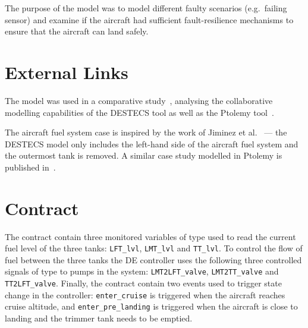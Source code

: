 The purpose of the model was to model different faulty scenarios
(e.g.\ failing sensor) and examine if the aircraft had sufficient
fault-resilience mechanisms to ensure that the aircraft can land
safely.


\section{External Links}

The model was used in a comparative study~\cite{Wolff&12}, analysing
the collaborative modelling capabilities of the DESTECS tool as well
as the Ptolemy tool~\cite{Buck&94,Davis&99,Eker&03}.

The aircraft fuel system case is inspired by the work of Jiminez et
al.~\cite{Jimenez&07} --- the DESTECS model only includes the
left-hand side of the aircraft fuel system and the outermost tank is
removed. A similar case study modelled in Ptolemy is published
in~\cite{DerlerLeeSangiovanniVincentelli11_ModelingCyberPhysicalSystems}.


\section{Contract}

The contract contain three monitored variables of type 
used to read the current fuel level of the three tanks:
\texttt{LFT\_lvl}, \texttt{LMT\_lvl} and \texttt{TT\_lvl}. To control
the flow of fuel between the three tanks the DE controller uses the
following three controlled signals of type  to pumps in the
system: \texttt{LMT2LFT\_valve}, \texttt{LMT2TT\_valve} and
\texttt{TT2LFT\_valve}. Finally, the contract contain two events used
to trigger state change in the controller: \texttt{enter\_cruise} is
triggered when the aircraft reaches cruise altitude, and
\texttt{enter\_pre\_landing} is triggered when the aircraft is close
to landing and the trimmer tank needs to be emptied.

